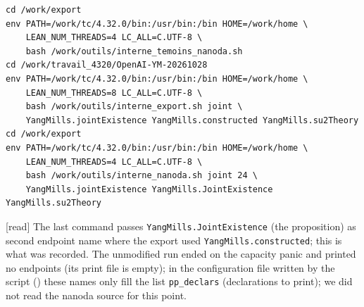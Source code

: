 \documentclass[11pt,a4paper]{article}
\theoremstyle{plain}
\theoremstyle{definition}
\theoremstyle{remark}
\numberwithin{equation}{section}
\newcommand{\st}[1]{\textsf{[#1]}}
\begin{document}
\begingroup\scriptsize
\begin{verbatim}
cd /work/export
env PATH=/work/tc/4.32.0/bin:/usr/bin:/bin HOME=/work/home \
    LEAN_NUM_THREADS=4 LC_ALL=C.UTF-8 \
    bash /work/outils/interne_temoins_nanoda.sh
cd /work/travail_4320/OpenAI-YM-20261028
env PATH=/work/tc/4.32.0/bin:/usr/bin:/bin HOME=/work/home \
    LEAN_NUM_THREADS=8 LC_ALL=C.UTF-8 \
    bash /work/outils/interne_export.sh joint \
    YangMills.jointExistence YangMills.constructed YangMills.su2Theory
cd /work/export
env PATH=/work/tc/4.32.0/bin:/usr/bin:/bin HOME=/work/home \
    LEAN_NUM_THREADS=4 LC_ALL=C.UTF-8 \
    bash /work/outils/interne_nanoda.sh joint 24 \
    YangMills.jointExistence YangMills.JointExistence YangMills.su2Theory
\end{verbatim}
\endgroup

\st{read} The last command passes \texttt{YangMills.JointExistence} (the proposition) as second endpoint name where the export used \texttt{YangMills.constructed}; this is what was recorded. The unmodified run ended on the capacity panic and printed no endpoints (its print file is empty); in the configuration file written by the script () these names only fill the list \texttt{pp\_declars} (declarations to print); we did not read the nanoda source for this point.
\end{document}
